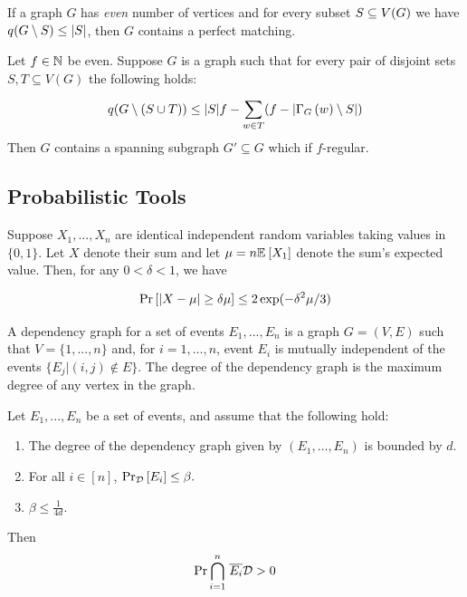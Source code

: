\documentclass[11pt]{article}
\begin{document}
\begin{lemma}\label{lemma:tutte-criterion}
If a graph $G$ has \emph{even} number of vertices and for every subset $S \subseteq V(G)$ we have $q(G \setminus S) \leq |S|$, then $G$ contains a perfect matching.
\end{lemma}

\begin{lemma}\label{lemma:tutte-criterion-factor}
  Let $f \in \mathbb{N}$ be even. Suppose $G$ is a graph such that for every pair of disjoint sets $S, T \subseteq V(G)$ the following holds:

  \[ q(G \setminus (S \cup T)) \le |S|f - \sum_{w \in T} (f - |\Gamma_{G}\left(w\right) \setminus S|) \]
  Then $G$ contains a spanning subgraph $G' \subseteq G$ which if $f$-regular.
\end{lemma}



\subsection{Probabilistic Tools}

\begin{lemma}\label{lemma:mult-chernoff}
Suppose $X_1, ..., X_n$ are identical independent random variables taking values in $\{0, 1\}$. Let $X$ denote their sum and let $\mu = n\mathbb{E}_{}\left[X_1\right]$ denote the sum's expected value. Then, for any $0 < \delta < 1$, we have

\[ \Pr\left[|X - \mu| \geq \delta \mu \right] \leq 2\exp(-\delta^2\mu/3)\]

\end{lemma}


A dependency graph for a set of events $E_1, . . . , E_n$ is a graph $G=(V, E)$ such that $V = \{1,.. . , n\}$ and,  for $i= 1,\dots, n$, event $E_i$ is mutually independent
of the events $\{E_j | (i, j) \notin E\}$. The degree of the dependency graph is the maximum degree of any vertex in the graph.


\begin{lemma}\label{lemma:lll}
Let $E_1,...,E_n$ be a set of events, and assume that the following hold:
\begin{enumerate}
\item The degree of the dependency graph given by $(E_1, \dots, E_n)$ is bounded by $d$.

\item For all $i \in [n]$, $\Pr_{\mathcal{D}}\left[E_i \right] \leq \beta.$

\item $\beta \leq \frac{1}{4d}$.
\end{enumerate}
Then
\[ \Pr{\overset{n}{ \underset{i=1}{\bigcap}} \hspace{0.1cm}  \overline{E_i}}{\mathcal{D}} > 0\]


\end{lemma}
\end{document}
